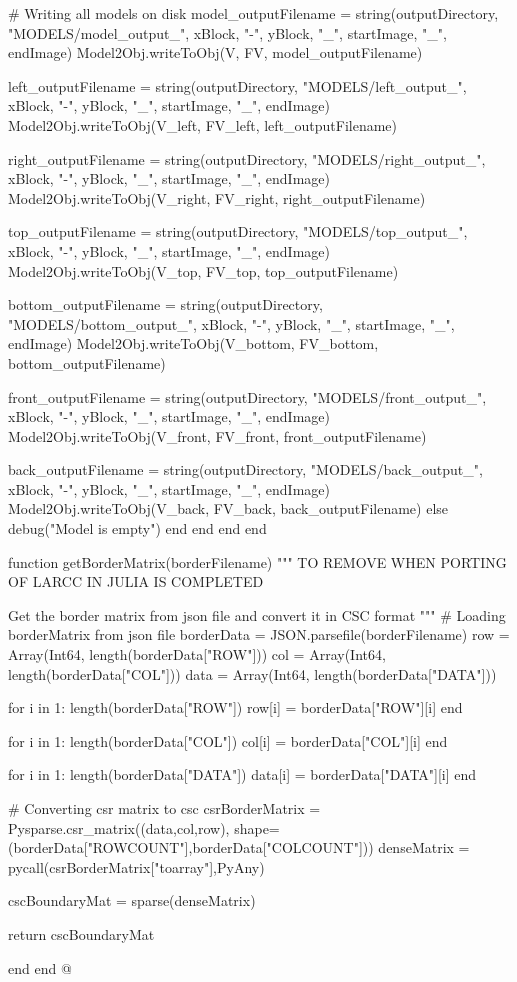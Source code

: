 \documentclass[11pt,oneside]{article}	%
\begin{document}
{        # Writing all models on disk
        model_outputFilename = string(outputDirectory, "MODELS/model_output_", xBlock, "-", yBlock, "_", startImage, "_", endImage)
        Model2Obj.writeToObj(V, FV, model_outputFilename)

        left_outputFilename = string(outputDirectory, "MODELS/left_output_", xBlock, "-", yBlock, "_", startImage, "_", endImage)
        Model2Obj.writeToObj(V_left, FV_left, left_outputFilename)

        right_outputFilename = string(outputDirectory, "MODELS/right_output_", xBlock, "-", yBlock, "_", startImage, "_", endImage)
        Model2Obj.writeToObj(V_right, FV_right, right_outputFilename)

        top_outputFilename = string(outputDirectory, "MODELS/top_output_", xBlock, "-", yBlock, "_", startImage, "_", endImage)
        Model2Obj.writeToObj(V_top, FV_top, top_outputFilename)

        bottom_outputFilename = string(outputDirectory, "MODELS/bottom_output_", xBlock, "-", yBlock, "_", startImage, "_", endImage)
        Model2Obj.writeToObj(V_bottom, FV_bottom, bottom_outputFilename)

        front_outputFilename = string(outputDirectory, "MODELS/front_output_", xBlock, "-", yBlock, "_", startImage, "_", endImage)
        Model2Obj.writeToObj(V_front, FV_front, front_outputFilename)

        back_outputFilename = string(outputDirectory, "MODELS/back_output_", xBlock, "-", yBlock, "_", startImage, "_", endImage)
        Model2Obj.writeToObj(V_back, FV_back, back_outputFilename)
      else
        debug("Model is empty")
      end
    end
  end
end

function getBorderMatrix(borderFilename)
  """
  TO REMOVE WHEN PORTING OF LARCC IN JULIA IS COMPLETED

  Get the border matrix from json file and convert it in
  CSC format
  """
  # Loading borderMatrix from json file
  borderData = JSON.parsefile(borderFilename)
  row = Array(Int64, length(borderData["ROW"]))
  col = Array(Int64, length(borderData["COL"]))
  data = Array(Int64, length(borderData["DATA"]))

  for i in 1: length(borderData["ROW"])
    row[i] = borderData["ROW"][i]
  end

  for i in 1: length(borderData["COL"])
    col[i] = borderData["COL"][i]
  end

  for i in 1: length(borderData["DATA"])
    data[i] = borderData["DATA"][i]
  end

  # Converting csr matrix to csc
  csrBorderMatrix = Pysparse.csr_matrix((data,col,row), shape=(borderData["ROWCOUNT"],borderData["COLCOUNT"]))
  denseMatrix = pycall(csrBorderMatrix["toarray"],PyAny)

  cscBoundaryMat = sparse(denseMatrix)

  return cscBoundaryMat

end
end
@}
\end{document}
